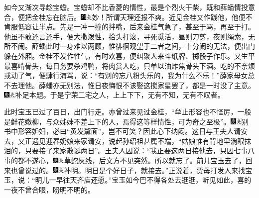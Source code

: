 如今又渐次寻趁宝蟾。宝蟾却不比香菱的情性，最是个烈火干柴，既和薛蟠情投意合，便把金桂忘在脑后。{\includegraphics[width=3mm]{../Images/00007}\includegraphics[width=3mm]{../Images/00012}\footnotesize \kaishu 妙！所谓天理还报不爽。}近见金桂又作践他，他便不肯服低容让半点。先是一冲一撞的拌嘴，后来金桂气急了，甚至于骂，再至于打。他虽不敢还言还手，便大撒泼性，拾头打滚，寻死觅活，昼则刀剪，夜则绳索，无所不闹。薛蟠此时一身难以两顾，惟徘徊观望于二者之间，十分闹的无法，便出门躲在外厢。金桂不发作性气，有时欢喜，便纠聚人来斗纸牌、掷骰子作乐。又生平最喜啃骨头，每日务要杀鸡鸭，将肉赏人吃，只单以油炸焦骨头下酒。吃的不奈烦或动了气，便肆行海骂，说：“有别的忘八粉头乐的，我为什么不乐！”薛家母女总不去理他。薛蟠亦无别法，惟日夜悔恨不该娶这搅家星罢了，都是一时没了主意。{\includegraphics[width=3mm]{../Images/00004}\includegraphics[width=3mm]{../Images/00012}\footnotesize \kaishu 补足本题。}于是宁荣二宅之人，上上下下，无有不知，无有不叹者。

此时宝玉已过了百日，出门行走。亦曾过来见过金桂，“举止形容也不怪厉，一般是鲜花嫩柳，与众姊妹不差上下的人，焉得这等样情性，可为奇之至极”。{\includegraphics[width=3mm]{../Images/00004}\includegraphics[width=3mm]{../Images/00012}\footnotesize \kaishu 别书中形容妒妇，必曰“黄发黧面”，岂不可笑？}因此心下纳闷。这日与王夫人请安去，又正遇见迎春奶娘来家请安，说起孙绍祖甚属不端，“姑娘惟有背地里淌眼抹泪的，只要接了来家散诞两日”。王夫人因说：“我正要这两日接他去，只因七事八事的都不遂心，{\includegraphics[width=3mm]{../Images/00004}\includegraphics[width=3mm]{../Images/00012}\footnotesize \kaishu 草蛇灰线，后文方不见突然。}所以就忘了。前儿宝玉去了，回来也曾说过的。{\includegraphics[width=3mm]{../Images/00004}\includegraphics[width=3mm]{../Images/00012}\footnotesize \kaishu 补明。}明日是个好日子，就接去。”正说着，贾母打发人来找宝玉，说：“明儿一早往天齐庙还愿。”宝玉如今巴不得各处去逛逛，听见如此，喜的一夜不曾合眼，盼明不明的。

